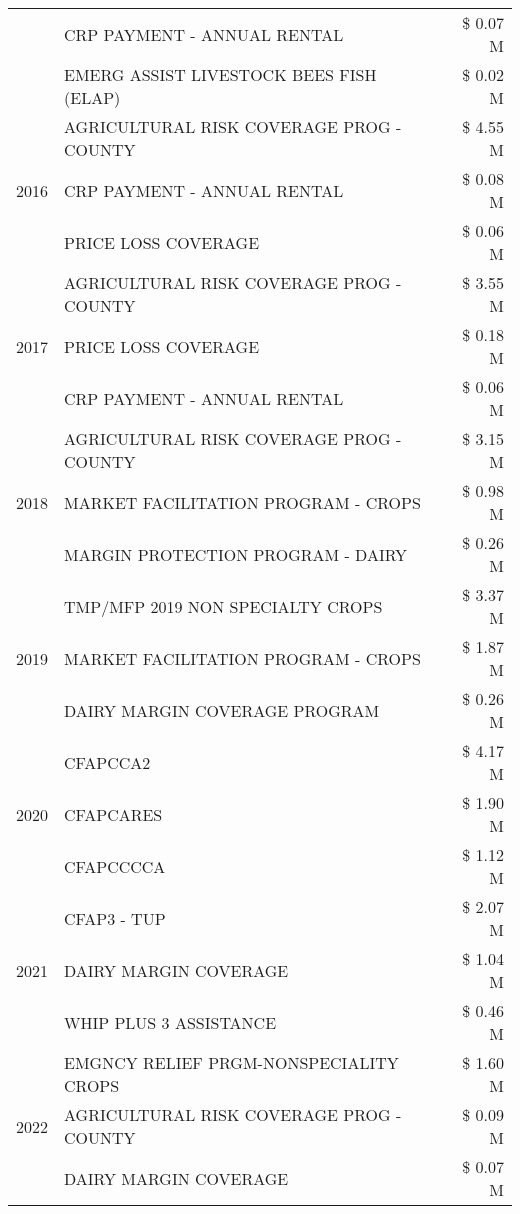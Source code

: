 \begin{tabular}{llr}
 & CRP PAYMENT - ANNUAL RENTAL & \$ 0.07 M \\
 & EMERG ASSIST LIVESTOCK BEES FISH (ELAP) & \$ 0.02 M \\
\cline{1-3}
\multirow[t]{3}{*}{2016} & AGRICULTURAL RISK COVERAGE PROG - COUNTY & \$ 4.55 M \\
 & CRP PAYMENT - ANNUAL RENTAL & \$ 0.08 M \\
 & PRICE LOSS COVERAGE & \$ 0.06 M \\
\cline{1-3}
\multirow[t]{3}{*}{2017} & AGRICULTURAL RISK COVERAGE PROG - COUNTY & \$ 3.55 M \\
 & PRICE LOSS COVERAGE & \$ 0.18 M \\
 & CRP PAYMENT - ANNUAL RENTAL & \$ 0.06 M \\
\cline{1-3}
\multirow[t]{3}{*}{2018} & AGRICULTURAL RISK COVERAGE PROG - COUNTY & \$ 3.15 M \\
 & MARKET FACILITATION PROGRAM - CROPS & \$ 0.98 M \\
 & MARGIN PROTECTION PROGRAM - DAIRY & \$ 0.26 M \\
\cline{1-3}
\multirow[t]{3}{*}{2019} & TMP/MFP 2019 NON SPECIALTY CROPS & \$ 3.37 M \\
 & MARKET FACILITATION PROGRAM - CROPS & \$ 1.87 M \\
 & DAIRY MARGIN COVERAGE PROGRAM & \$ 0.26 M \\
\cline{1-3}
\multirow[t]{3}{*}{2020} & CFAPCCA2 & \$ 4.17 M \\
 & CFAPCARES & \$ 1.90 M \\
 & CFAPCCCCA & \$ 1.12 M \\
\cline{1-3}
\multirow[t]{3}{*}{2021} & CFAP3 - TUP & \$ 2.07 M \\
 & DAIRY MARGIN COVERAGE & \$ 1.04 M \\
 & WHIP PLUS 3 ASSISTANCE & \$ 0.46 M \\
\cline{1-3}
\multirow[t]{3}{*}{2022} & EMGNCY RELIEF PRGM-NONSPECIALITY CROPS & \$ 1.60 M \\
 & AGRICULTURAL RISK COVERAGE PROG - COUNTY & \$ 0.09 M \\
 & DAIRY MARGIN COVERAGE & \$ 0.07 M \\
\cline{1-3}
\bottomrule
\end{tabular}
